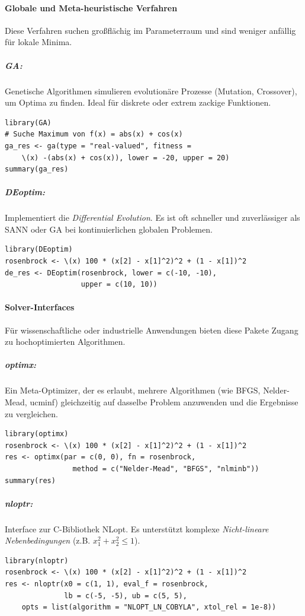 \documentclass[10pt,twocolumn]{scrartcl}
\begin{document}
\paragraph{Globale und Meta-heuristische Verfahren}
Diese Verfahren suchen großflächig im Parameterraum und sind weniger anfällig für lokale Minima.

\subparagraph{GA:} Genetische Algorithmen simulieren evolutionäre Prozesse (Mutation, Crossover), um Optima zu finden. Ideal für diskrete oder extrem zackige Funktionen.
\begin{lstlisting}
library(GA)
# Suche Maximum von f(x) = abs(x) + cos(x)
ga_res <- ga(type = "real-valued", fitness =
    \(x) -(abs(x) + cos(x)), lower = -20, upper = 20)
summary(ga_res)
\end{lstlisting}

\subparagraph{DEoptim:} Implementiert die \emph{Differential Evolution}. Es ist oft schneller und zuverlässiger als SANN oder GA bei kontinuierlichen globalen Problemen.
\begin{lstlisting}
library(DEoptim)
rosenbrock <- \(x) 100 * (x[2] - x[1]^2)^2 + (1 - x[1])^2
de_res <- DEoptim(rosenbrock, lower = c(-10, -10),
                  upper = c(10, 10))
\end{lstlisting}

\paragraph{Solver-Interfaces}
Für wissenschaftliche oder industrielle Anwendungen bieten diese Pakete Zugang zu hochoptimierten Algorithmen.

\subparagraph{optimx:} Ein Meta-Optimizer, der es erlaubt, mehrere Algorithmen (wie BFGS, Nelder-Mead, ucminf) gleichzeitig auf dasselbe Problem anzuwenden und die Ergebnisse zu vergleichen.
\begin{lstlisting}
library(optimx)
rosenbrock <- \(x) 100 * (x[2] - x[1]^2)^2 + (1 - x[1])^2
res <- optimx(par = c(0, 0), fn = rosenbrock, 
                method = c("Nelder-Mead", "BFGS", "nlminb"))
summary(res)
\end{lstlisting}

\subparagraph{nloptr:} Interface zur C-Bibliothek NLopt. Es unterstützt komplexe \emph{Nicht-lineare Nebenbedingungen} (z.B. $x_1^2 + x_2^2 \le 1$).
\begin{lstlisting}
library(nloptr)
rosenbrock <- \(x) 100 * (x[2] - x[1]^2)^2 + (1 - x[1])^2
res <- nloptr(x0 = c(1, 1), eval_f = rosenbrock, 
              lb = c(-5, -5), ub = c(5, 5),
    opts = list(algorithm = "NLOPT_LN_COBYLA", xtol_rel = 1e-8))
\end{lstlisting}
\end{document}

